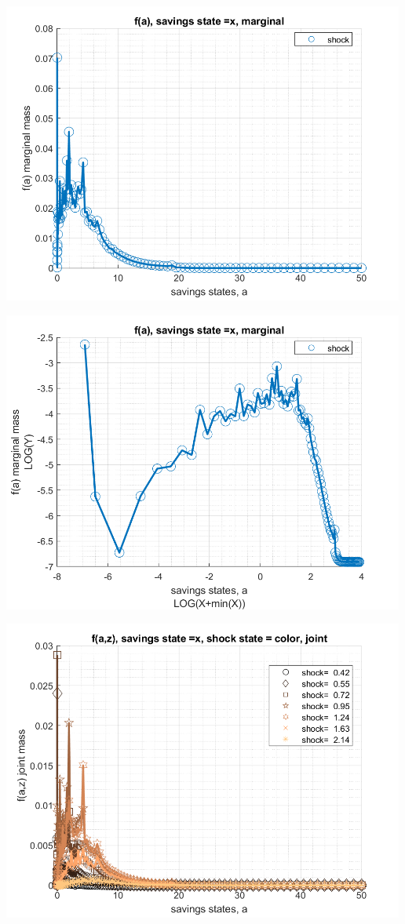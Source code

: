 \documentclass[
]{book}
\begin{document}
\includegraphics[width=5.20833in,height=\textheight]{img/fx_ds_az_loop_images/figure_2.png}

\includegraphics[width=5.20833in,height=\textheight]{img/fx_ds_az_loop_images/figure_3.png}

\includegraphics[width=5.20833in,height=\textheight]{img/fx_ds_az_loop_images/figure_4.png}
\end{document}

